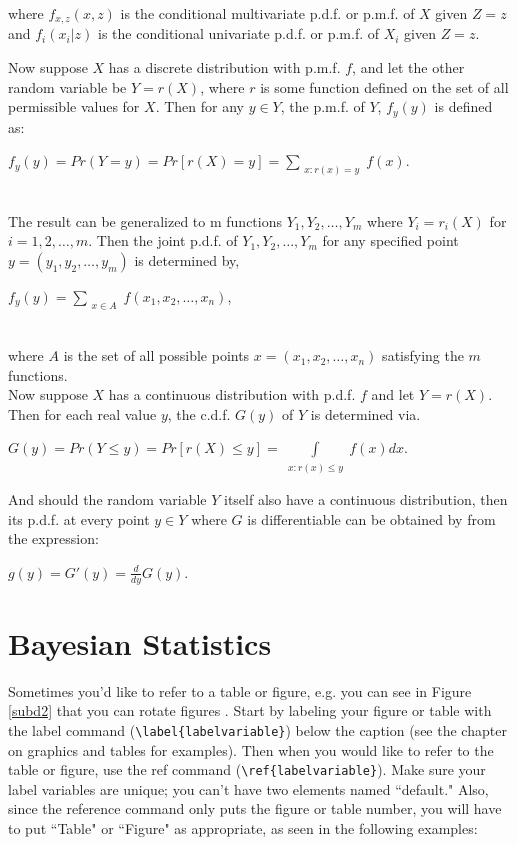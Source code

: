 \documentclass[12pt,twoside]{reedthesis}
\begin{document}
\begin{enumerate}
\begin{enumerate}
where $f_{x,z}(x, z)$ is the conditional multivariate p.d.f. or p.m.f. of $X$ given $Z = z$ and $f_i(x_i|z)$ is the conditional univariate p.d.f. or p.m.f. of $X_i$ given $Z = z$. 

Now suppose $X$ has a discrete distribution with p.m.f. $f$, and let the other random variable be $Y = r(X)$, where $r$ is some function defined on the set of all permissible values for $X$. Then for any $y \in Y$, the p.m.f. of $Y$, $f_y(y)$ is defined as:
\begin{center}
$f_y(y) = Pr(Y = y) = Pr[r(X) = y] = \sum\limits_{\substack{x:r(x)  = y}} f(x)$.
\end{center}\\

The result can be generalized to m functions $Y_1, Y_2, … , Y_m$ where $Y_i = r_i(X)$ for $i = {1, 2, \dotsc, m}$. Then the joint p.d.f. of $Y_1, Y_2, \dotsc , Y_m$ for any specified point $y = (y_1, y_2, … , y_m)$ is determined by,
\begin{center}
$f_y(y) = \sum\limits_{\substack{x \in A}} f(x_1, x_2, \dotsc ,x_n)$,
\end{center}\\

where $A$ is the set of all possible points $x = (x_1, x_2, \dotsc , x_n)$ satisfying the $m$ functions.\\
  
Now suppose $X$ has a continuous distribution with p.d.f. $f$ and let $Y = r(X)$. Then for each real value $y$, the c.d.f. $G(y)$ of $Y$ is determined via. 
\begin{center}
$G(y) = Pr(Y \leq y) = Pr[r(X) \leq y] =  \int\limits_{\substack{x:r(x)  ≤ y}} f(x) dx$.
\end{center}
And should the random variable $Y$ itself also have a continuous distribution, then its p.d.f. at every point $y \in Y$ where $G$ is differentiable can be obtained by from the expression: 
\begin{center}
$g(y) = G'(y) = \frac{d}{dy} G(y)$.
\end{center}


\section{Bayesian Statistics}
Sometimes you'd like to refer to a table or figure, e.g. you can see in Figure \ref{subd2} that you can rotate figures . Start by labeling your figure or table with the label command (\verb=\label{labelvariable}=) below the caption (see the chapter on graphics and tables for examples). Then when you would like to refer to the table or figure, use the ref command (\verb=\ref{labelvariable}=). Make sure your label variables are unique; you can't have two elements named ``default." Also, since the reference command only puts the figure or table number, you will have to put  ``Table" or ``Figure" as appropriate, as seen in the following examples:



\end{enumerate}
\end{enumerate}
\end{document}
